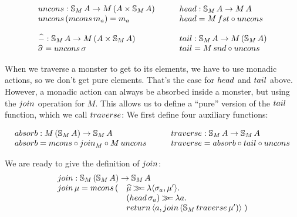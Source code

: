 $$
\begin{array}{l}
\uncons : \stream{M}\,A \rightarrow M\,(A \times \stream{M}\,A)\\
\uncons\, (\mcons\, m_a) = m_a \\
\,\\
\unc{-} : \stream{M}\,A \rightarrow M\,(A\times \stream{M}\,A)\\
\unc{\sigma} = \uncons\,\sigma
\end{array}
\qquad
\begin{array}{l}
\head : \stream{M}\,A \rightarrow M\,A\\
\head = M\,\fst \comp \uncons\\
\,\\
\tail : \stream{M}\,A \rightarrow M\,(\stream{M}\,A)\\
\tail = M\,\snd \comp \uncons\\
\end{array}
$$

When we traverse a monster to get to its elements, we have to use monadic actions, so we don't get pure elements.
That's the case for $\head$ and $\tail$ above.
However, a monadic action can always be absorbed inside a monster, but using the $\join$ operation for $M$.
This allows us to define a ``pure'' version of the $\tail$ function, which we call $\traverse$:
We first define four auxiliary functions:

$$
\begin{array}{l}
\absorb : M\,(\stream{M}\,A) \rightarrow \stream{M}\,A \\
\absorb =  \mcons \comp \join_{M} \comp M\,\uncons
\end{array}
  \qquad
\begin{array}{l}
\traverse : \stream{M}\,A \rightarrow \stream{M}\,A \\
\traverse = \absorb \comp \tail \comp \uncons
\end{array}
$$

We are ready to give the definition of $\join$:
$$
\begin{array}{ll}
\multicolumn{2}{l}{\join: \stream{M}\,(\stream{M}\,A) \rightarrow \stream{M}\,A}\\
\join\,\mu = \mcons\,(
  & \unc{\mu} \bind
    \lambda \pair{\sigma_a}{\mu'}.\\
  &  (\head\,\sigma_a) \bind \lambda a.\\
  & \return\,\pair{a}{\join\,(\stream{M}\,\traverse\, \mu')} \; )
\end{array}
$$

